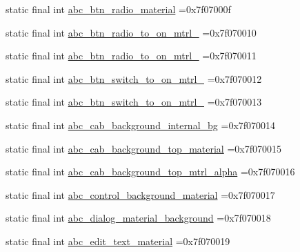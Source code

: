 \begin{DoxyCompactItemize}
\item 
static final int \mbox{\hyperlink{classbr_1_1unb_1_1cic_1_1mp_1_1marketmaster_1_1R_1_1drawable_aa8ea45978fabed8bbc36c64984ac62f7}{abc\+\_\+btn\+\_\+radio\+\_\+material}} =0x7f07000f
\item 
static final int \mbox{\hyperlink{classbr_1_1unb_1_1cic_1_1mp_1_1marketmaster_1_1R_1_1drawable_a7432cfff5f088dd4d027012c76c60635}{abc\+\_\+btn\+\_\+radio\+\_\+to\+\_\+on\+\_\+mtrl\+\_}} =0x7f070010
\item 
static final int \mbox{\hyperlink{classbr_1_1unb_1_1cic_1_1mp_1_1marketmaster_1_1R_1_1drawable_ab5258d7d69cc46ef96a5779779911a15}{abc\+\_\+btn\+\_\+radio\+\_\+to\+\_\+on\+\_\+mtrl\+\_}} =0x7f070011
\item 
static final int \mbox{\hyperlink{classbr_1_1unb_1_1cic_1_1mp_1_1marketmaster_1_1R_1_1drawable_aaf62b67cbb33e9f5351f6ccc28b4b8b4}{abc\+\_\+btn\+\_\+switch\+\_\+to\+\_\+on\+\_\+mtrl\+\_}} =0x7f070012
\item 
static final int \mbox{\hyperlink{classbr_1_1unb_1_1cic_1_1mp_1_1marketmaster_1_1R_1_1drawable_a236a2ebe9db5a87b705f88f0df1eb913}{abc\+\_\+btn\+\_\+switch\+\_\+to\+\_\+on\+\_\+mtrl\+\_}} =0x7f070013
\item 
static final int \mbox{\hyperlink{classbr_1_1unb_1_1cic_1_1mp_1_1marketmaster_1_1R_1_1drawable_a0b3c827eb8710389dfee16281ef40794}{abc\+\_\+cab\+\_\+background\+\_\+internal\+\_\+bg}} =0x7f070014
\item 
static final int \mbox{\hyperlink{classbr_1_1unb_1_1cic_1_1mp_1_1marketmaster_1_1R_1_1drawable_a2dc1b396529018dead7474239e4682ec}{abc\+\_\+cab\+\_\+background\+\_\+top\+\_\+material}} =0x7f070015
\item 
static final int \mbox{\hyperlink{classbr_1_1unb_1_1cic_1_1mp_1_1marketmaster_1_1R_1_1drawable_ab9689b2f57cef68a9f791ed23ec84af6}{abc\+\_\+cab\+\_\+background\+\_\+top\+\_\+mtrl\+\_\+alpha}} =0x7f070016
\item 
static final int \mbox{\hyperlink{classbr_1_1unb_1_1cic_1_1mp_1_1marketmaster_1_1R_1_1drawable_ac368e8f29e82dde3696b98ae6e5ad2bc}{abc\+\_\+control\+\_\+background\+\_\+material}} =0x7f070017
\item 
static final int \mbox{\hyperlink{classbr_1_1unb_1_1cic_1_1mp_1_1marketmaster_1_1R_1_1drawable_ab5a0a53626b0d60ea3a5cfe85ad1d405}{abc\+\_\+dialog\+\_\+material\+\_\+background}} =0x7f070018
\item 
static final int \mbox{\hyperlink{classbr_1_1unb_1_1cic_1_1mp_1_1marketmaster_1_1R_1_1drawable_ace9493574331cd804200637bf022552f}{abc\+\_\+edit\+\_\+text\+\_\+material}} =0x7f070019

\end{DoxyCompactItemize}
